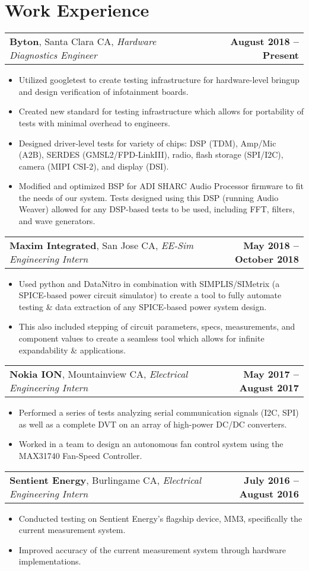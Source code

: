 \documentclass[letterpaper,\fontSize pt]{article}
\makeatletter
\newcommand{\experienceSubheading}[4]{
  \vspace{5pt}
    \begin{tabular*}{\textwidth}[t]{l@{\extracolsep{\fill}}r}
      \textbf{#1}, #2, \textit{#3} & \textbf{#4}
    \end{tabular*}\vspace{-7pt}
}
\newcommand{\resumeItem}[1]{
  \item\small{
    #1 \vspace{-5pt}
  }
}
\newcommand{\resumeItemListStart}{\begin{itemize}}
\newcommand{\resumeItemListEnd}{\end{itemize}\vspace{-5pt}}
\makeatother
\begin{document}
\section{Work Experience}
	\experienceSubheading {Byton}
	{Santa Clara CA}{Hardware Diagnostics Engineer}{August 2018 -- Present}
      	\resumeItemListStart
			\resumeItem {Utilized googletest to create testing infrastructure for hardware-level bringup and design verification of infotainment boards.}
        		\resumeItem {Created new standard for testing infrastructure which allows for portability of tests with minimal overhead to engineers.}
        		\resumeItem {Designed driver-level tests for variety of chips: DSP (TDM), Amp/Mic (A2B), SERDES (GMSL2/FPD-LinkIII), radio, flash storage (SPI/I2C), camera (MIPI CSI-2), and display (DSI).}
        		\ifdefined\detailedInfo
        		\resumeItem {Modified and optimized BSP for ADI SHARC Audio Processor firmware to fit the needs of our system. Tests designed using this DSP (running Audio Weaver) allowed for any DSP-based tests to be used, including FFT, filters, and wave generators.}
        		\fi
      	\resumeItemListEnd
	\experienceSubheading {Maxim Integrated}
	{San Jose CA}{EE-Sim Engineering Intern}{May 2018 – October 2018}
		\resumeItemListStart
			\resumeItem {Used python and DataNitro in combination with SIMPLIS/SIMetrix (a SPICE-based power circuit simulator) to create a tool to fully automate testing \& data extraction of any SPICE-based power system design.}
			\resumeItem {This also included stepping of circuit parameters, specs, measurements, and component values to create a seamless tool which allows for infinite expandability \& applications.}
		\resumeItemListEnd
	\experienceSubheading {Nokia ION}
	{Mountainview CA} {Electrical Engineering Intern}{May 2017 – August 2017}
		\resumeItemListStart
			\resumeItem {Performed a series of tests analyzing serial communication signals (I2C, SPI) as well as a complete DVT on an array of high-power DC/DC converters.}
			\resumeItem {Worked in a team to design an autonomous fan control system using the MAX31740 Fan-Speed Controller.}
		\resumeItemListEnd
	\experienceSubheading {Sentient Energy}
	{Burlingame CA}{Electrical Engineering Intern}{July 2016 -- August 2016}
		\resumeItemListStart
			\resumeItem {Conducted testing on Sentient Energy’s flagship device, MM3, specifically the current measurement system.}
			\resumeItem {Improved accuracy of the current measurement system through hardware implementations.}
		\resumeItemListEnd


\end{document}
